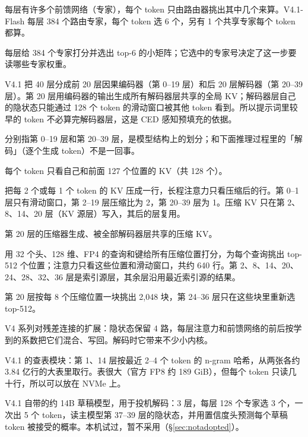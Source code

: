 \documentclass[11pt,a4paper]{article}
\begin{document}
\begin{description}\small
  \item[MoE（混合专家）] 每层有许多个前馈网络（专家），每个 token 只由路由器挑出其中几个来算。V4.1-Flash 每层 384 个路由专家，每个 token 选 6 个，另有 1 个共享专家每个 token 都算。
  \item[路由器（gate）] 每层给 384 个专家打分并选出 top-6 的小矩阵；它选中的专家号决定了这一步要读哪些专家权重。
  \item[CED（编码器-解码器结构）] V4.1 把 40 层分成前 20 层因果编码器（第 0--19 层）和后 20 层解码器（第 20--39 层）。第 20 层用编码器的输出生成所有解码器层共享的全局 KV；解码器层自己的隐状态只能通过 128 个 token 的滑动窗口被其他 token 看到。所以提示词里较早的 token 不必算完解码器层，这是 CED 感知预填充的依据。
  \item[编码器层、解码器层] 分别指第 0--19 层和第 20--39 层，是模型结构上的划分；和下面推理过程里的「解码」（逐个生成 token）不是一回事。
  \item[滑动窗口注意力（SWA）] 每个 token 只看自己和前面 127 个位置的 KV（共 128 个）。
  \item[压缩注意力、压缩比] 把每 2 个或每 1 个 token 的 KV 压成一行，长程注意力只看压缩后的行。第 0--1 层只有滑动窗口，第 2--19 层压缩比为 2，第 20--39 层为 1。压缩 KV 只在第 2、8、14、20 层（KV 源层）写入，其后的层复用。
  \item[全局 KV] 第 20 层的压缩器生成、被全部解码器层共享的压缩 KV。
  \item[稀疏索引器（lightning indexer）] 用 32 个头、128 维、FP4 的查询和键给所有压缩位置打分，为每个查询挑出 top-512 个位置；注意力只看这些位置和滑动窗口，共约 640 行。第 2、8、14、20、24、28、32、36 层是索引源层，其余层沿用最近索引源的结果。
  \item[候选块] 第 20 层按每 8 个压缩位置一块挑出 2,048 块，第 24--36 层只在这些块里重新选 top-512。
  \item[超连接（hc）] V4 系列对残差连接的扩展：隐状态保留 4 路，每层注意力和前馈网络的前后按学到的系数把它们混合、写回。解码时它带来不少小内核。
  \item[Engram] V4.1 的查表模块：第 1、14 层按最近 2--4 个 token 的 n-gram 哈希，从两张各约 3.84 亿行的大表里取行。表很大（官方 FP8 约 189 GiB），但每个 token 只读几十行，所以可以放在 NVMe 上。
  \item[DSpark] V4.1 自带的约 14B 草稿模型，用于投机解码：3 层，每层 128 个专家选 3 个，一次出 5 个 token，读主模型第 37--39 层的隐状态，并用置信度头预测每个草稿 token 被接受的概率。本机试过，暂不采用（\S\ref{sec:notadopted}）。
\end{description}
\end{document}
